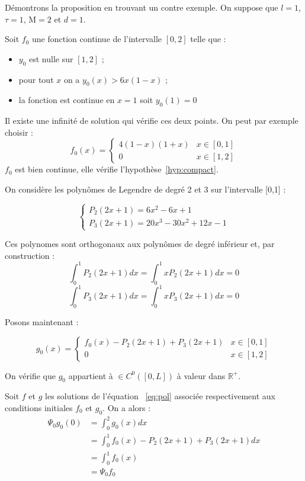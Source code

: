 \documentclass[a4paper]{article}
\newcommand{\mass}{\mathrm{M}}
\newcommand{\dep}{d}
\begin{document}
\begin{preuve}
	Démontrons la proposition en trouvant un contre exemple.
	On suppose que $l=1$, $\tau =1$, $\mass=2$ et $\dep=1$. 
	
	Soit $f_0$ une fonction continue de l'intervalle $[0,2]$ telle que :
	\begin{itemize}
		\item $y_0$ est nulle sur $[1,2]$ ;
		 \item pour tout $x$ on a $y_0(x)> 6x(1-x)$ ;
		 \item la fonction est continue en $x=1$ soit $y_0(1)=0$
   \end{itemize}

Il existe une infinité de solution qui vérifie ces deux points. On peut par exemple choisir :
	\[
	f_0 (x) = \begin{cases}
		       4(1-x)(1+x) & x \in [0,1]\\
		       0  & x \in [1,2]
	          \end{cases}
	\]
	$f_0$ est bien continue, elle vérifie l'hypothèse~\eqref{hyp:compact}. 
	
	On considère les polynômes de Legendre de degré 2 et 3 sur l'intervalle [0,1] :
	
	\[
	\begin{cases}
		P_2(2x+1) = 6x^2-6x+1 \\
		P_3(2x+1) = 20x^3 - 30x^2 +12x -1
	\end{cases}
	\]
	
	Ces polynomes sont orthogonaux aux polynômes de degré inférieur et, par construction : 
	\[ \int_0^1 P_2(2x+1)dx = \int_0^1 x P_2(2x+1)dx  =0 \]
	\[ \int_0^1 P_3(2x+1)dx = \int_0^1 x P_3(2x+1)dx =0 \]
	
	Posons maintenant :
	
	\[
	g_0 (x) = \begin{cases}
		       f_0 (x) - P_2(2x+1) + P_3(2x+1) & x \in [0,1]\\
		       0  & x \in [1,2]
	          \end{cases}
	\]
	
	On vérifie que $g_0$ appartient à $\in C^0([0,L])$ à valeur dans $\mathbb{R}^+$.
	
	Soit $f$ et $g$ les solutions de l'équation ~\eqref{eq:pol} associée respectivement aux conditions initiales $f_0$ et $g_0$. On a alors :
	\[
	\begin{split}
		\Psi_0 g_0 (0) & = \int_0^2 g_0(x)dx \\
		               & = \int_0^1 f_0 (x) - P_2(2x+1) + P_3(2x+1) dx \\
					   & =  \int_0^1 f_0 (x) \\
					   & = \Psi_0 f_0 
	\end{split}
	\]
	

\end{preuve}
\end{document}
